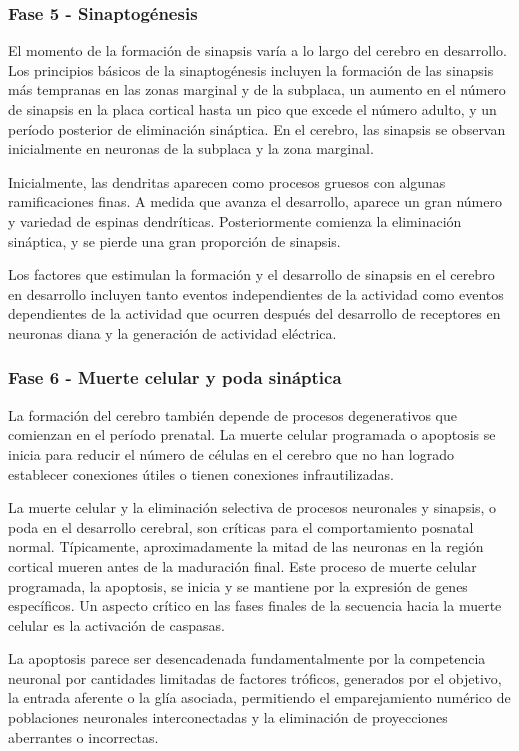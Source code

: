 \documentclass[11pt,letterpaper]{report}
\begin{document}
\subsubsection{Fase 5 - Sinaptogénesis}
El momento de la formación de sinapsis varía a lo largo del cerebro en
desarrollo. Los principios básicos de la sinaptogénesis incluyen la formación
de las sinapsis más tempranas en las zonas marginal y de la subplaca, un
aumento en el número de sinapsis en la placa cortical hasta un pico que excede
el número adulto, y un período posterior de eliminación sináptica. En el
cerebro, las sinapsis se observan inicialmente en neuronas de la subplaca y la
zona marginal. \cite{Polin124}

Inicialmente, las dendritas aparecen como procesos gruesos con algunas 
ramificaciones finas. A medida que avanza el desarrollo, aparece un gran número
y variedad de espinas dendríticas. Posteriormente comienza la eliminación
sináptica, y se pierde una gran proporción de sinapsis. \cite{Polin124}

Los factores que estimulan la formación y el desarrollo de sinapsis en el
cerebro en desarrollo incluyen tanto eventos independientes de la actividad
como eventos dependientes de la actividad que ocurren después del desarrollo de
receptores en neuronas diana y la generación de actividad eléctrica.
\cite{Polin124}

\subsubsection{Fase 6 - Muerte celular y poda sináptica}
La formación del cerebro también depende de procesos degenerativos que
comienzan en el período prenatal. La muerte celular programada o apoptosis se
inicia para reducir el número de células en el cerebro que no han logrado
establecer conexiones útiles o tienen conexiones infrautilizadas.
\cite{Gibb2018}

La muerte celular y la eliminación selectiva de procesos neuronales y sinapsis,
o poda en el desarrollo cerebral, son críticas para el comportamiento posnatal
normal. Típicamente, aproximadamente la mitad de las neuronas en la región
cortical mueren antes de la maduración final. Este proceso de muerte celular
programada, la apoptosis, se inicia y se mantiene por la expresión de genes
específicos. Un aspecto crítico en las fases finales de la secuencia hacia la
muerte celular es la activación de caspasas. \cite{Polin124}

La apoptosis parece ser desencadenada fundamentalmente por la competencia
neuronal por cantidades limitadas de factores tróficos, generados por el
objetivo, la entrada aferente o la glía asociada, permitiendo el emparejamiento
numérico de poblaciones neuronales interconectadas y la eliminación de
proyecciones aberrantes o incorrectas. \cite{Polin124}
\end{document}
